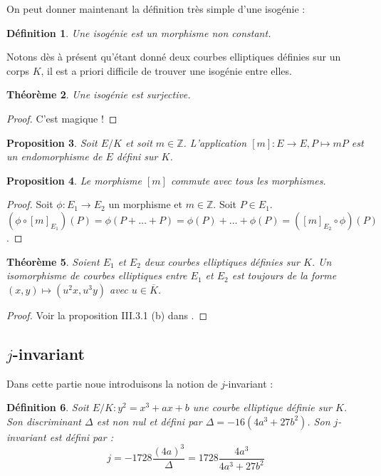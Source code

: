 \documentclass{article}
\theoremstyle{plain}%
\newtheorem{thm}{Théorème}[section]
\newtheorem{prop}[thm]{Proposition}
\newtheorem{deff}[thm]{Définition}
\theoremstyle{definition}%
\newcommand{\Z}{\mathbb{Z}}
\newcommand{\ol}{\overline}
\begin{document}
On peut donner maintenant la définition très simple d'une isogénie :

\begin{deff}
  Une isogénie est un morphisme non constant.
\end{deff}

Notons dès à présent qu'étant donné deux courbes elliptiques définies sur un corps $K$, il est a priori difficile de trouver une isogénie entre elles.

\begin{thm}
  Une isogénie est surjective.  
\end{thm}

\begin{proof}
  C'est magique !
\end{proof}

\begin{prop}
  Soit $E/K$ et soit $m\in\Z$. L'application $[m] : E \to E, P \mapsto mP$ est un endomorphisme de $E$ défini sur $K$. 
\end{prop}

\begin{prop}
  Le morphisme $[m]$ commute avec tous les morphismes. 
\end{prop}

\begin{proof}
  Soit $\phi : E_1\to E_2$ un morphisme et $m\in\Z$. Soit $P\in E_1$. $(\phi \circ [m]_{E_1})(P) = \phi(P + \ldots + P) = \phi(P) + \ldots + \phi(P) = ([m]_{E_2} \circ \phi)(P)$.
\end{proof}

\begin{thm}
  \label{forme_iso}
  Soient $E_1$ et $E_2$ deux courbes elliptiques définies sur $K$. Un isomorphisme de courbes elliptiques entre $E_1$ et $E_2$ est toujours de la forme $(x, y)\mapsto (u^2x, u^3y)$ avec $u\in \ol K$.  
\end{thm}

\begin{proof}
  Voir la proposition III.3.1 (b) dans \cite{Silverman}.
\end{proof}

\subsection{$j$-invariant}

Dans cette partie noue introduisons la notion de $j$-invariant :


\begin{deff}
  Soit $E/K : y^2 = x^3 + ax + b$ une courbe elliptique définie sur $K$. Son discriminant $\Delta$ est non nul et défini par $\Delta = -16(4a^3 + 27b^2)$. Son $j$-invariant est défini par : $$j = -1728\frac{(4a)^3}{\Delta} = 1728\frac{4a^3}{4a^3 + 27b^2}$$ 
\end{deff}
\end{document}
